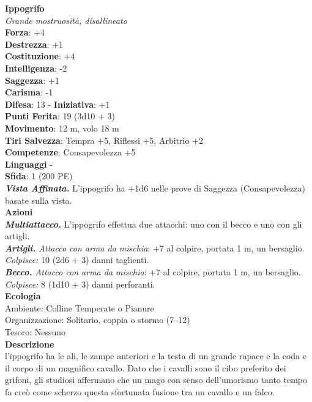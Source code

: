 \begin{multicols}{2}
\medskip\textbf{Ippogrifo}\\
\emph{Grande mostruosità, disallineato}\\
\textbf{Forza}: +4\\
\textbf{Destrezza}: +1\\
\textbf{Costituzione}: +4\\
\textbf{Intelligenza}: -2\\
\textbf{Saggezza}: +1\\
\textbf{Carisma}: -1\\
\textbf{Difesa}: 13 - \textbf{Iniziativa}: +1\\
\textbf{Punti Ferita}: 19 (3d10 + 3)\\
\textbf{Movimento}: 12 m, volo 18 m\\
\textbf{Tiri Salvezza}: Tempra +5, Riflessi +5, Arbitrio +2\\
\textbf{Competenze}: Consapevolezza +5\\
\textbf{Linguaggi} -\\
\textbf{Sfida}: 1 (200 PE)\smallskip\\
\emph{\textbf{Vista Affinata.}} L'ippogrifo ha +1d6 nelle prove di Saggezza (Consapevolezza) basate sulla vista.\\
\smallskip\textbf{Azioni}\\
\emph{\textbf{Multiattacco.}} L'ippogrifo effettua due attacchi: uno con il becco e uno con gli artigli.\\
\emph{\textbf{Artigli.} Attacco con arma da mischia}: +7 al colpire, portata 1 m, un bersaglio.\\
\emph{Colpisce:} 10 (2d6 + 3) danni taglienti.\\
\emph{\textbf{Becco.} Attacco con arma da mischia}: +7 al colpire, portata 1 m, un bersaglio.\\
\emph{Colpisce:} 8 (1d10 + 3) danni perforanti. \\
\textbf{Ecologia}\\
Ambiente: Colline Temperate o Pianure\\
Organizzazione: Solitario, coppia o stormo (7–12)\\
Tesoro: Nessuno\\
\textbf{Descrizione}\\
l'ippogrifo ha le ali, le zampe anteriori e la testa di un grande rapace e la coda e il corpo di un magnifico cavallo. Dato che i cavalli sono il cibo preferito dei grifoni, gli studiosi affermano che un mago con senso dell'umorismo tanto tempo fa creò come scherzo questa sfortunata fusione tra un cavallo e un falco.\\


\end{multicols}
